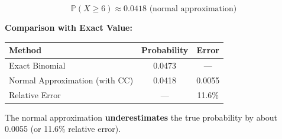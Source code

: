 \documentclass[12pt]{article}
\begin{document}
\begin{solution}
\[
\boxed{\mathbb{P}(X \geq 6) \approx 0.0418 \text{ (normal approximation)}}
\]

\textbf{Comparison with Exact Value:}

\begin{center}
\begin{tabular}{lcc}
\toprule
Method & Probability & Error \\
\midrule
Exact Binomial & 0.0473 & --- \\
Normal Approximation (with CC) & 0.0418 & 0.0055 \\
Relative Error & --- & 11.6\% \\
\bottomrule
\end{tabular}
\end{center}

The normal approximation \textbf{underestimates} the true probability by about 0.0055 (or 11.6\% relative error).
\end{solution}
\end{document}
